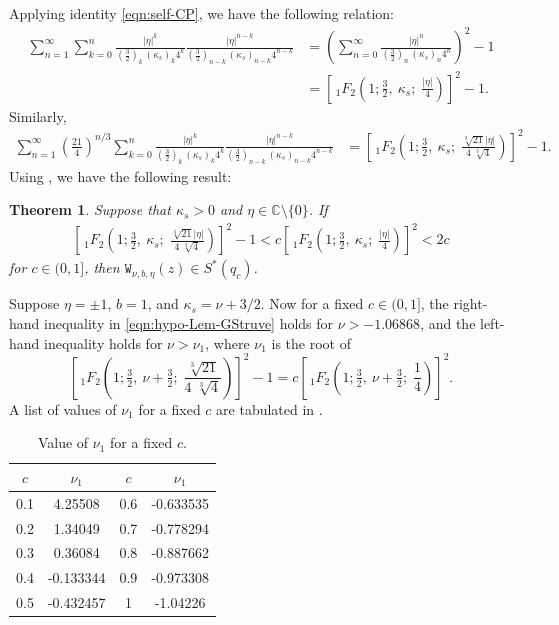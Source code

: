 \documentclass[a4paper,11pt,reqno]{amsart}
\newtheorem{theorem}{Theorem}[section]
\begin{document}
Applying identity \eqref{eqn:self-CP}, we have the following relation:
\begin{align*}
\sum_{n=1}^{\infty} \sum_{k=0}^n \tfrac{|\eta|^{k}}{\left(\tfrac{3}{2}\right)_{k} \,\left(\kappa_{s}  \right)_{k} 4^{k}} \tfrac{|\eta|^{n-k}}{\left(\tfrac{3}{2}\right)_{n-k} \,\left(\kappa_{s}  \right)_{n-k} 4^{n-k}}
&=\left(\sum_{n=0}^{\infty}  \tfrac{|\eta|^{n}}{\left(\tfrac{3}{2}\right)_{n} \,\left(\kappa_{s}  \right)_{n} 4^{n}} \right)^2-1\\
&=\left[\,{}_{1}F_{2}\!\left(1; \tfrac{3}{2},\ \kappa_{s};\;\frac{|\eta|}{4}\right)\right]^{2} - 1. 
\end{align*}
Similarly, 
\begin{align*}
\sum_{n=1}^{\infty} \left(\tfrac{21}{4}\right)^{n/3}\sum_{k=0}^n \tfrac{|\eta|^{k}}{\left(\tfrac{3}{2}\right)_{k} \,\left(\kappa_{s}  \right)_{k} 4^{k}} \tfrac{|\eta|^{n-k}}{\left(\tfrac{3}{2}\right)_{n-k} \,\left(\kappa_{s}  \right)_{n-k} 4^{n-k}}
&=\left[\,{}_{1}F_{2}\!\left(1; \tfrac{3}{2},\ \kappa_{s};\;\frac{\sqrt[3]{21}|\eta|}{4\; \sqrt[3]{4}}\right)\right]^{2} - 1. 
\end{align*}
Using , we have the following result: 
\begin{theorem}\label{thm:Lem-GStruve}
   Suppose that $\kappa_s>0$ and $\eta \in \mathbb{C}\setminus \{0\}$. If 
    \begin{align}\label{eqn:hypo-Lem-GStruve}
        \left[\,{}_{1}F_{2}\!\left(1; \tfrac{3}{2},\ \kappa_{s};\;\frac{\sqrt[3]{21}|\eta|}{4\; \sqrt[3]{4}}\right)\right]^{2} - 1< c \left[\,{}_{1}F_{2}\!\left(1; \tfrac{3}{2},\ \kappa_{s};\;\frac{|\eta|}{4}\right)\right]^{2} < 2 c
    \end{align}
    for $c \in (0, 1]$, then $\mathtt{W}_{\nu, b, \eta}(z) \in S^{\ast}(q_c)$. 
\end{theorem}

Suppose $\eta=\pm 1$, $b=1$, and $\kappa_s=\nu+3/2$. Now for a fixed $c \in (0, 1]$, the right-hand inequality in \eqref{eqn:hypo-Lem-GStruve} holds for $\nu> -1.06868$, and the left-hand inequality holds for 
$\nu> \nu_1$, where $\nu_1$ is the root of 
\[\left[\,{}_{1}F_{2}\!\left(1; \tfrac{3}{2},\ \nu+\tfrac{3}{2};\;\frac{\sqrt[3]{21}}{4\; \sqrt[3]{4}}\right)\right]^{2} - 1= c \left[\,{}_{1}F_{2}\!\left(1; \tfrac{3}{2},\ \nu+\tfrac{3}{2};\;\frac{1}{4}\right)\right]^{2}.\]
A list of values of $\nu_1$ for a fixed $c$ are tabulated in . 
\begin{table}[h]
   \begin{tabular}{|c|c|c|c|}
   \hline
 $c$ & $\nu_1$  &$c$ & $\nu_1$\\ \hline
 0.1 & 4.25508 & 0.6 & -0.633535 \\
 0.2 & 1.34049 &  0.7 & -0.778294 \\
 0.3 & 0.36084 &  0.8 & -0.887662 \\
 0.4 & -0.133344 & 0.9 & -0.973308 \\
 0.5 & -0.432457 &1 & -1.04226 \\
 \hline
\end{tabular}
    \caption{Value of $\nu_1$ for a fixed $c$. }
    \label{tab:value-nu1}
\end{table}
\end{document}
